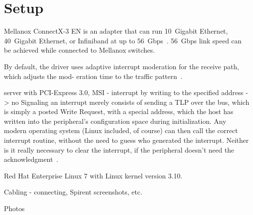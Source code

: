
\chapter{Setup}

Mellanox ConnectX-3 EN is an adapter that can run 10~Gigabit Ethernet, 40~Gigabit Ethernet,
or Infiniband at up to 56~Gbps~\cite{mellanox-product-brief}.
56~Gbps link speed can be achieved while connected to Mellanox switches.

By default, the driver uses adaptive interrupt moderation for the receive path, which adjusts the mod-
eration time to the traffic pattern~\cite{mellanox-user-manual}.


server with PCI-Express 3.0,
MSI - interrupt by writing to the specified address -> no 
Signaling an interrupt merely consists of sending a TLP over the bus,
which is simply a posted Write Request, with a special address,
which the host has written into the peripheral’s configuration space during initialization.
Any modern operating system (Linux included, of course) can then call the correct interrupt routine,
without the need to guess who generated the interrupt.
Neither is it really necessary to clear the interrupt,
if the peripheral doesn’t need the acknowledgment~\cite{pcie-tutorial-1}.


Red Hat Enterprise Linux 7 with Linux kernel version 3.10.

Cabling - connecting, Spirent screenshots, etc.

Photos
